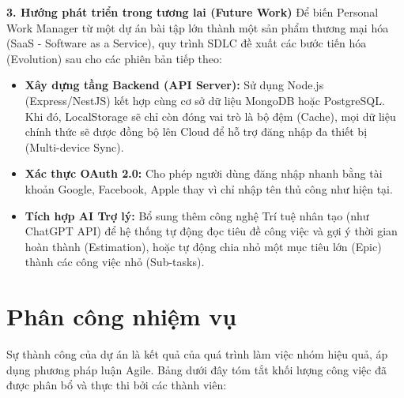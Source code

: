 \textbf{3. Hướng phát triển trong tương lai (Future Work)}
Để biến Personal Work Manager từ một dự án bài tập lớn thành một sản phẩm thương mại hóa (SaaS - Software as a Service), quy trình SDLC đề xuất các bước tiến hóa (Evolution) sau cho các phiên bản tiếp theo:
\begin{itemize}
    \item \textbf{Xây dựng tầng Backend (API Server):} Sử dụng Node.js (Express/NestJS) kết hợp cùng cơ sở dữ liệu MongoDB hoặc PostgreSQL. Khi đó, LocalStorage sẽ chỉ còn đóng vai trò là bộ đệm (Cache), mọi dữ liệu chính thức sẽ được đồng bộ lên Cloud để hỗ trợ đăng nhập đa thiết bị (Multi-device Sync).
    \item \textbf{Xác thực OAuth 2.0:} Cho phép người dùng đăng nhập nhanh bằng tài khoản Google, Facebook, Apple thay vì chỉ nhập tên thủ công như hiện tại.
    \item \textbf{Tích hợp AI Trợ lý:} Bổ sung thêm công nghệ Trí tuệ nhân tạo (như ChatGPT API) để hệ thống tự động đọc tiêu đề công việc và gợi ý thời gian hoàn thành (Estimation), hoặc tự động chia nhỏ một mục tiêu lớn (Epic) thành các công việc nhỏ (Sub-tasks).
\end{itemize}

\section*{Phân công nhiệm vụ}

Sự thành công của dự án là kết quả của quá trình làm việc nhóm hiệu quả, áp dụng phương pháp luận Agile. Bảng dưới đây tóm tắt khối lượng công việc đã được phân bổ và thực thi bởi các thành viên:

